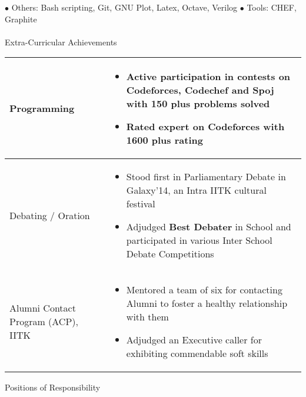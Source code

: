 \documentclass{article}
\begin{document}
$\bullet$ Others: Bash scripting, Git, GNU Plot, Latex, Octave, Verilog \hspace{1.9099cm}$\bullet$ Tools: CHEF, Graphite\\ \\
{\Large Extra-Curricular Achievements}
\newline
\newline
\begin{tabular}{| P{3cm} |  P{15.4cm}|}
\hline
\vspace{0.3cm}Programming & \vspace{-0.4cm}\begin{itemize}[leftmargin=0.3cm]
\setlength\itemsep{0.2pt}
\item Active participation in contests on Codeforces, Codechef and Spoj with \textbf{150 plus} problems solved
\item Rated expert on Codeforces with 1600 plus rating
\end{itemize}\\
\hline
\vspace{0.3cm}Debating / Oration & \vspace{-0.4cm}\begin{itemize}[leftmargin=0.3cm]
\setlength\itemsep{0.2pt}
\item Stood first in Parliamentary Debate in Galaxy'14, an Intra IITK cultural festival 
\item Adjudged \textbf{Best Debater} in School and participated in various Inter School Debate Competitions
\end{itemize}\\
\hline
\vspace{0cm}Alumni Contact Program (ACP), IITK & \vspace{-0.4cm}\begin{itemize}[leftmargin=0.3cm]
\setlength\itemsep{0.2pt}
\item Mentored a team of six for contacting Alumni to foster a healthy relationship with them
\item Adjudged an Executive caller for exhibiting commendable soft skills\end{itemize}\\
\hline
\end{tabular}\vspace{0.2cm}
{\Large Positions of Responsibility}
\newline
\newline
\end{document}
